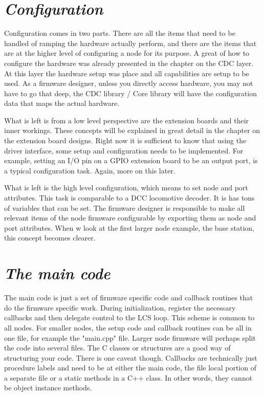 \section{\textit{Configuration}}

Configuration comes in two parts. There are all the items that need to be handled of ramping the hardware actually perform, and there are the items that are at the higher level of configuring a node for its purpose. A great of how to configure the hardware was already presented in the chapter on the CDC layer. At this layer the hardware setup was place and all capabilities are setup to be used. As a firmware designer, unless you directly access hardware, you may not have to go that deep, the CDC library / Core library will have the configuration data that maps the actual hardware. 

What is left is from a low level perspective are the extension boards and their inner workings. These concepts will be explained in great detail in the chapter on the extension board designs. Right now it is sufficient to know that using the driver interface, some setup and configuration needs to be implemented. For example, setting an I/O pin on a GPIO extension board to be an output port, is a typical configuration task. Again, more on this later.

What is left is the high level configuration, which means to set node and port attributes. This task is comparable to a DCC locomotive decoder. It is has tons of variables  that can be set. The firmware designer is responsible to make all relevant items of the node firmware configurable by exporting them as node and port attributes. When w look at the first larger node example, the base station, this concept becomes clearer.

\section{\textit{The main code}}

The main code is just a set of firmware specific code and callback routines that do the firmware specific work. During initialization, register the necessary callbacks and then delegate control to the LCS loop. This scheme is common to all nodes. For smaller nodes, the setup code and callback routines can be all in one file, for example the "main.cpp" file. Larger node firmware will perhaps split the code into several files. The C\+\+ classes or structures are a good way of structuring your code. There is one caveat though. Callbacks are technically just procedure labels and need to be at either the main code, the file local portion of a separate file or a static methods in a C++ class. In other words, they cannot be object instance methods.

